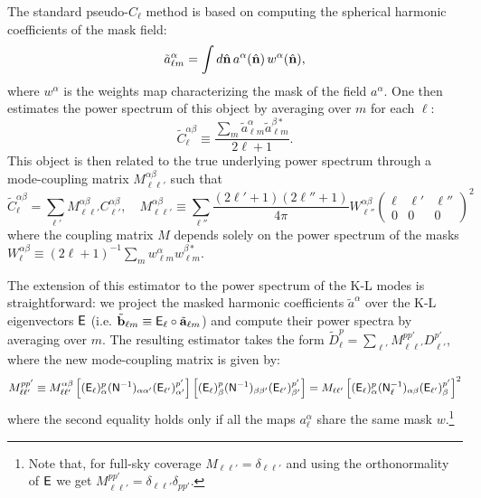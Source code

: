 \documentclass[twocolumn,amsfont,amssymb,amsmath, showpacs,balancelastpage, nofootinbib]{revtex4-1}
\newcommand{\nv}{\hat{\bf n}}
\begin{document}
  The standard pseudo-$C_\ell$ method is based on computing the spherical harmonic coefficients of the mask field:
  \begin{equation}
    \tilde{a}^\alpha_{\ell m}=\int d\nv\,a^\alpha(\nv)\,w^\alpha(\nv),
  \end{equation}
  where $w^\alpha$ is the weights map characterizing the mask of the field $a^\alpha$. One then estimates the power spectrum of this object by averaging over $m$ for each $\ell$:
  \begin{equation}
    \tilde{C}^{\alpha\beta}_\ell\equiv\frac{\sum_m\tilde{a}^\alpha_{\ell m}\tilde{a}^{\beta *}_{\ell m}}{2\ell+1}.
  \end{equation}
  This object is then related to the true underlying power spectrum through a mode-coupling matrix $M^{\alpha\beta}_{\ell\ell'}$ such that
  \begin{equation}
    \tilde{C}^{\alpha\beta}_\ell=\sum_{\ell'}M^{\alpha\beta}_{\ell\ell'}C^{\alpha\beta}_{\ell'},\hspace{12pt}
    M^{\alpha\beta}_{\ell \ell'}\equiv\sum_{\ell''}\frac{(2\ell'+1)(2\ell''+1)}{4\pi}W^{\alpha\beta}_{\ell''}
    \left(
    \begin{array}{ccc}
      \ell & \ell' & \ell''\\
      0 & 0 & 0
    \end{array}
    \right)^2
  \end{equation}
  where the coupling matrix $M$ depends solely on the power spectrum of the masks $W^{\alpha\beta}_\ell\equiv(2\ell+1)^{-1}\sum_mw^\alpha_{\ell m}w^{\beta *}_{\ell m}$.
  
  The extension of this estimator to the power spectrum of the K-L modes is straightforward: we project the masked harmonic coefficients $\tilde{a}^\alpha$ over the K-L eigenvectors ${\sf E}$ (i.e. $\tilde{\bf b}_{\ell m}\equiv {\sf E}_\ell\circ\tilde{\bf a}_{\ell m}$) and compute their power spectra by averaging over $m$. The resulting estimator takes the form $\tilde{D}^p_\ell=\sum_{\ell'}M_{\ell\ell'}^{pp'}D^{p'}_{\ell'}$, where the new mode-coupling matrix is given by:
  \begin{equation}
    M^{pp'}_{\ell\ell'}\equiv M^{\alpha\beta}_{\ell\ell'}\left[({\sf E}_\ell)^p_\alpha({\sf N}^{-1})_{\alpha\alpha'}({\sf E}_{\ell'})^{p'}_{\alpha'}\right]\left[({\sf E}_\ell)^p_\beta({\sf N}^{-1})_{\beta\beta'}({\sf E}_{\ell'})^{p'}_{\beta'}\right]
    =M_{\ell\ell'}\left[({\sf E}_\ell)^p_\alpha({\sf N}^{-1}_\ell)_{\alpha\beta}({\sf E}_{\ell'})^{p'}_\beta\right]^2
  \end{equation}
  where the second equality holds only if all the maps $a^\alpha_\ell$ share the same mask $w$.\footnote{Note that, for full-sky coverage $M_{\ell\ell'}=\delta_{\ell\ell'}$ and using the orthonormality of ${\sf E}$ we get $M^{pp'}_{\ell\ell'}=\delta_{\ell\ell'}\delta_{pp'}$.}
\end{document}
